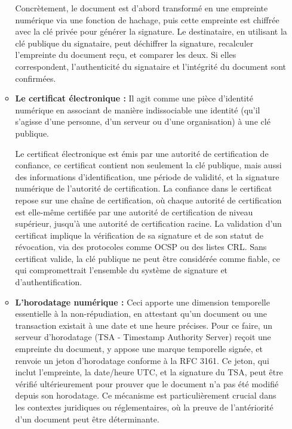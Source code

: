 \documentclass[11pt]{article}
\begin{document}
\begin{itemize}
\begin{itemize}
        Concrètement, le document est d’abord transformé en une empreinte numérique via une fonction de hachage, puis cette empreinte est chiffrée avec la clé privée pour générer la signature. Le destinataire, en utilisant la 
        clé publique du signataire, peut déchiffrer la signature, recalculer l’empreinte du document reçu, et comparer les deux. Si elles correspondent, l’authenticité du signataire et l’intégrité du document sont confirmées.

        \item \textbf{Le certificat électronique :}
        Il agit comme une pièce d’identité numérique en associant de manière indissociable une identité (qu’il s’agisse d’une personne, d’un serveur ou d’une organisation) à une clé publique.

        Le certificat électronique est émis par une autorité de certification de confiance, ce certificat contient non seulement la clé publique, mais aussi des informations d’identification, une période de validité, et la signature numérique de l’autorité de certification. La confiance dans le certificat repose sur une chaîne de certification, où chaque autorité de certification est elle-même certifiée par une autorité de certification de niveau supérieur, jusqu’à une autorité de certification racine. La validation d’un certificat implique la vérification de sa signature et de son statut de révocation, via des protocoles comme OCSP ou des listes CRL. Sans certificat valide, la clé publique ne peut être considérée comme fiable, ce qui compromettrait l’ensemble du système de signature et d’authentification.
        \item \textbf{L’horodatage numérique : } 
        Ceci apporte une dimension temporelle essentielle à la non-répudiation, en attestant qu’un document ou une transaction existait à une date et une heure précises. Pour ce faire, un serveur d’horodatage (TSA - Timestamp Authority Server) reçoit une empreinte du document, y appose une marque temporelle signée, et renvoie un jeton d’horodatage conforme à la RFC 3161. Ce jeton, qui inclut l’empreinte, la date/heure UTC, et la signature du TSA, peut être vérifié ultérieurement pour prouver que le document n’a pas été modifié depuis son horodatage. Ce mécanisme est particulièrement crucial dans les contextes juridiques ou réglementaires, où la preuve de l’antériorité d’un document peut être déterminante.


\end{itemize}
\end{itemize}
\end{document}
